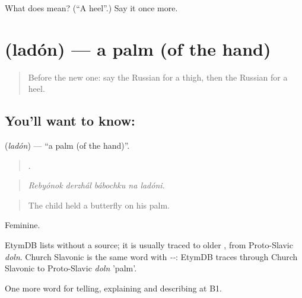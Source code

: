 \begin{tcolorbox}[breakable,colback=teal!4,colframe=teal!35!black,title={Before you move on}]
What does  mean? (\textquotedblleft{}A heel\textquotedblright{}.) Say it once more.
\end{tcolorbox}
\section[\texorpdfstring{\ru{ладонь} (ladón)}{ладонь (ladón)}]{ (ladón) — a palm (of the hand)}

\label{lesson:RU-C481-ladon}



\begin{quote}
Before the new one: say the Russian for a thigh, then the Russian for a heel.
\end{quote}

\subsection*{You'll want to know: }
\textbf{} (\emph{ladón}) — \textquotedblleft{}a palm (of the hand)\textquotedblright{}.

\begin{quote}
    .
\end{quote}

\begin{quote}
\emph{Rebyónok derzhál bábochku na ladóni.}
\end{quote}

\begin{quote}
The child held a butterfly on his palm.
\end{quote}

Feminine.

\begin{cousinweb}
EtymDB lists \emph{} without a source; it is usually traced to older \emph{}, from Proto-Slavic \emph{doln}. Church Slavonic \emph{} is the same word with \emph{--}: EtymDB traces \emph{} through Church Slavonic to Proto-Slavic \emph{doln} 'palm'.
\end{cousinweb}

\begin{grammarlens}[title={What you've built}]
One more word for telling, explaining and describing at B1.
\end{grammarlens}


